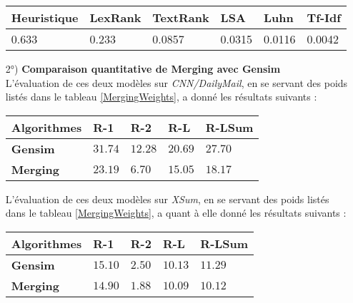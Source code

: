 \begin{itemize}
\begin{center}
\label{MergingWeights}
\setlength{\arrayrulewidth}{1pt}
\begin{tabular}{|p{2.4cm}|p{2.4cm}|p{2.4cm}|p{2.4cm}|p{2.4cm}|p{2.4cm}|}
\hline
 \textbf{Heuristique} & \textbf{LexRank}  & \textbf{TextRank} & \textbf{LSA} & \textbf{Luhn}  & \textbf{Tf-Idf} \\
\hline
\hline
 0.633 & 0.233  & 0.0857 & 0.0315 & 0.0116  & 0.0042 \\
\hline
\end{tabular}
\end{center}
\item[2°)] \textbf{Comparaison quantitative de Merging avec Gensim}\\
L'évaluation de ces deux modèles sur \textit{CNN/DailyMail}, en se servant des poids listés dans le tableau \ref{MergingWeights}, a donné les résultats suivants :
\begin{center}
\label{MergingVsGensimOnCNN}
\setlength{\arrayrulewidth}{1pt}
\begin{tabular}{|p{4cm}||p{2.5cm}|p{2.5cm}|p{2.5cm}|p{2.5cm}|}
\hline
\cellcolor{gris}\textbf{Algorithmes} & R-1  & R-2 & R-L & R-LSum \\
\hline
\hline
\textbf{Gensim} & $ 31.74 $  & $ 12.28 $  & $ 20.69 $ & $ 27.70 $ \\
\hline
\textbf{Merging} & $ 23.19 $ & $ 6.70 $  & $ 15.05 $ & $ 18.17 $ \\
\hline
\end{tabular}
\end{center}
L'évaluation de ces deux modèles sur \textit{XSum}, en se servant des poids listés dans le tableau \ref{MergingWeights}, a quant à elle donné les résultats suivants :
\begin{center}
\label{MergingVsGensimOnXSum}
\setlength{\arrayrulewidth}{1pt}
\begin{tabular}{|p{4cm}||p{2.5cm}|p{2.5cm}|p{2.5cm}|p{2.5cm}|}
\hline
\cellcolor{gris}\textbf{Algorithmes} & R-1  & R-2 & R-L & R-LSum \\
\hline
\hline
\textbf{Gensim} & $ 15.10 $  & $ 2.50 $  & $ 10.13 $ & $ 11.29 $ \\
\hline
\textbf{Merging} & $ 14.90 $ & $ 1.88 $  & $ 10.09 $ & $ 10.12 $ \\
\hline
\end{tabular}
\end{center}
\end{itemize}
